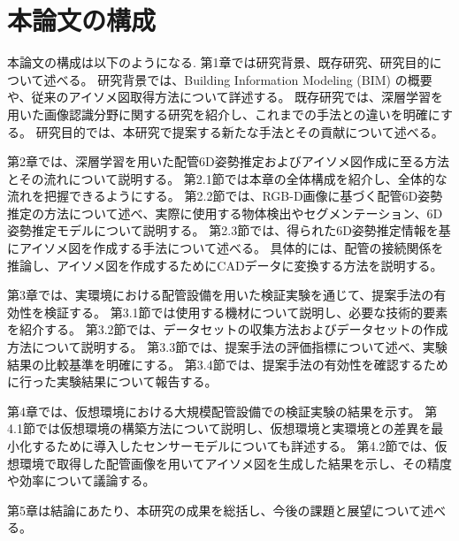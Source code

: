 \section{本論文の構成}
本論文の構成は以下のようになる.
第1章では研究背景、既存研究、研究目的について述べる。
研究背景では、Building Information Modeling (BIM) の概要や、従来のアイソメ図取得方法について詳述する。
既存研究では、深層学習を用いた画像認識分野に関する研究を紹介し、これまでの手法との違いを明確にする。
研究目的では、本研究で提案する新たな手法とその貢献について述べる。

第2章では、深層学習を用いた配管6D姿勢推定およびアイソメ図作成に至る方法とその流れについて説明する。
第2.1節では本章の全体構成を紹介し、全体的な流れを把握できるようにする。
第2.2節では、RGB-D画像に基づく配管6D姿勢推定の方法について述べ、実際に使用する物体検出やセグメンテーション、6D姿勢推定モデルについて説明する。
第2.3節では、得られた6D姿勢推定情報を基にアイソメ図を作成する手法について述べる。
具体的には、配管の接続関係を推論し、アイソメ図を作成するためにCADデータに変換する方法を説明する。

第3章では、実環境における配管設備を用いた検証実験を通じて、提案手法の有効性を検証する。
第3.1節では使用する機材について説明し、必要な技術的要素を紹介する。
第3.2節では、データセットの収集方法およびデータセットの作成方法について説明する。
第3.3節では、提案手法の評価指標について述べ、実験結果の比較基準を明確にする。
第3.4節では、提案手法の有効性を確認するために行った実験結果について報告する。

第4章では、仮想環境における大規模配管設備での検証実験の結果を示す。
第4.1節では仮想環境の構築方法について説明し、仮想環境と実環境との差異を最小化するために導入したセンサーモデルについても詳述する。
第4.2節では、仮想環境で取得した配管画像を用いてアイソメ図を生成した結果を示し、その精度や効率について議論する。

第5章は結論にあたり、本研究の成果を総括し、今後の課題と展望について述べる。
